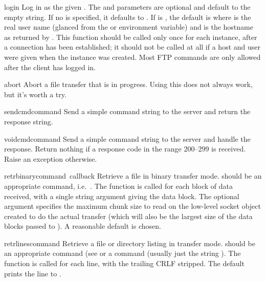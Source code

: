 \begin{funcdesc}{login}{}
Log in as the given .  The  and 
parameters are optional and default to the empty string.  If no
 is specified, it defaults to .  If
 is , the default  is
 where  is the real user
name (glanced from the  or  environment
variable) and  is the hostname as returned by
.  This function should be called only
once for each instance, after a connection has been established; it
should not be called at all if a host and user were given when the
instance was created.  Most FTP commands are only allowed after the
client has logged in.
\end{funcdesc}

\begin{funcdesc}{abort}{}
Abort a file transfer that is in progress.  Using this does not always
work, but it's worth a try.
\end{funcdesc}

\begin{funcdesc}{sendcmd}{command}
Send a simple command string to the server and return the response
string.
\end{funcdesc}

\begin{funcdesc}{voidcmd}{command}
Send a simple command string to the server and handle the response.
Return nothing if a response code in the range 200--299 is received.
Raise an exception otherwise.
\end{funcdesc}

\begin{funcdesc}{retrbinary}{command\, callback}
Retrieve a file in binary transfer mode.   should be an
appropriate  command, i.e.\ .
The  function is called for each block of data received,
with a single string argument giving the data block.
The optional  argument specifies the maximum chunk size to
read on the low-level socket object created to do the actual transfer
(which will also be the largest size of the data blocks passed to
).  A reasonable default is chosen.
\end{funcdesc}

\begin{funcdesc}{retrlines}{command}
Retrieve a file or directory listing in \ASCII{} transfer mode.
 should be an appropriate  command (see
 or a  command (usually just the string
).  The  function is called for each line,
with the trailing CRLF stripped.  The default  prints
the line to .
\end{funcdesc}

